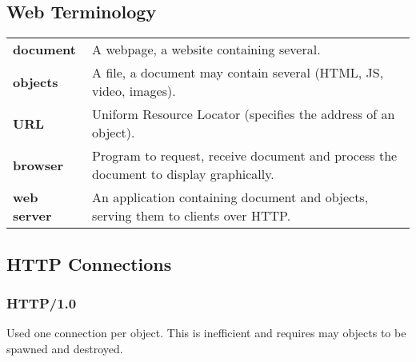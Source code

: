 \documentclass{report}
\begin{document}
\subsection*{Web Terminology}
\begin{center}
	\begin{tabular}{l p{}}
		\textbf{document}   & A webpage, a website containing several.                                              \\
		\textbf{objects}    & A file, a document may contain several (HTML, JS, video, images).                     \\
		\textbf{URL}        & Uniform Resource Locator (specifies the address of an object).                        \\
		\textbf{browser}    & Program to request, receive document and process the document to display graphically. \\
		\textbf{web server} & An application containing document and objects, serving them to clients over HTTP.    \\
	\end{tabular}
\end{center}
\subsection*{HTTP Connections}
\subsubsection*{HTTP/1.0}
Used one  connection per object. This is inefficient and requires may objects to be spawned and destroyed.
\end{document}
